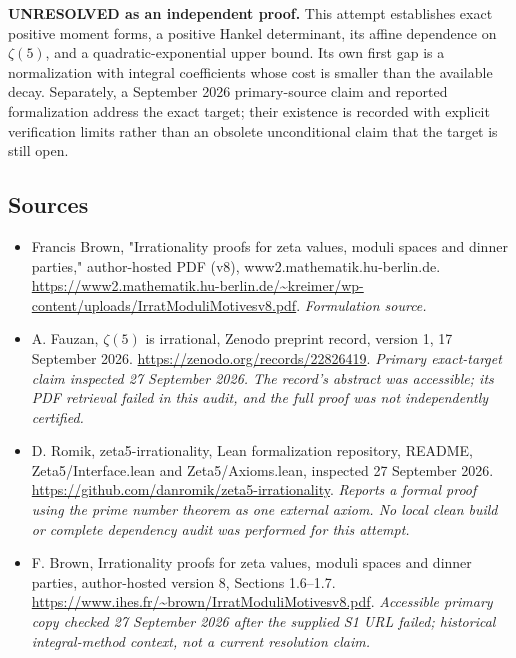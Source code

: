 \documentclass[11pt]{article}
\begin{document}
\textbf{UNRESOLVED as an independent proof.} This attempt establishes exact positive moment forms, a positive Hankel determinant, its affine dependence on $\zeta(5)$, and a quadratic-exponential upper bound. Its own first gap is a normalization with integral coefficients whose cost is smaller than the available decay. Separately, a September 2026 primary-source claim and reported formalization address the exact target; their existence is recorded with explicit verification limits rather than an obsolete unconditional claim that the target is still open.

\subsection{Sources}
\begin{itemize}
\item[S1]Francis Brown, "Irrationality proofs for zeta values, moduli spaces and dinner parties," author-hosted PDF (v8), www2.mathematik.hu-berlin.de.
\url{https://www2.mathematik.hu-berlin.de/~kreimer/wp-content/uploads/IrratModuliMotivesv8.pdf}.
\textit{Formulation source.}
\item[E1]A. Fauzan, $\zeta(5)$ is irrational, Zenodo preprint record, version 1, 17 September 2026.
\url{https://zenodo.org/records/22826419}.
\textit{Primary exact-target claim inspected 27 September 2026. The record's abstract was accessible; its PDF retrieval failed in this audit, and the full proof was not independently certified.}
\item[E2]D. Romik, zeta5-irrationality, Lean formalization repository, README, Zeta5/Interface.lean and Zeta5/Axioms.lean, inspected 27 September 2026.
\url{https://github.com/danromik/zeta5-irrationality}.
\textit{Reports a formal proof using the prime number theorem as one external axiom. No local clean build or complete dependency audit was performed for this attempt.}
\item[E3]F. Brown, Irrationality proofs for zeta values, moduli spaces and dinner parties, author-hosted version 8, Sections 1.6--1.7.
\url{https://www.ihes.fr/~brown/IrratModuliMotivesv8.pdf}.
\textit{Accessible primary copy checked 27 September 2026 after the supplied S1 URL failed; historical integral-method context, not a current resolution claim.}
\end{itemize}
\end{document}
